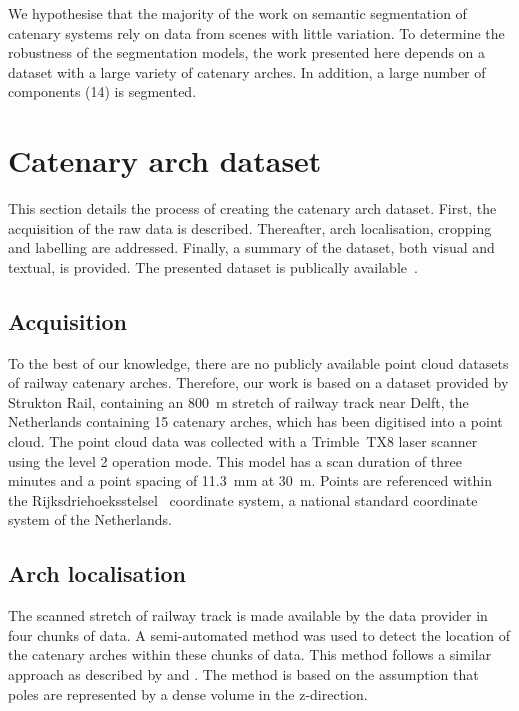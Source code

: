 We hypothesise that the majority of the work on semantic segmentation of catenary systems rely on data from scenes with little variation. To determine the robustness of the segmentation models, the work presented here depends on a dataset with a large variety of catenary arches.  In addition, a large number of components (14) is segmented.


\section{Catenary arch dataset}\label{sec:semseg:data}
This section details the process of creating the catenary arch dataset. First, the acquisition of the raw data is described. Thereafter, arch localisation, cropping and labelling are addressed. Finally, a summary of the dataset, both visual and textual, is provided. The presented dataset is publically available~\cite{ton2022labelled}.

\subsection{Acquisition}
To the best of our knowledge, there are no publicly available point cloud datasets of railway catenary arches.
Therefore, our work is based on a dataset provided by Strukton Rail, containing an 800~m stretch of railway track near Delft, the Netherlands containing 15 catenary arches, which has been digitised into a point cloud. The point cloud data was collected with a Trimble~TX8 laser scanner using the level 2 operation mode. This model has a scan duration of three minutes and a point spacing of 11.3~mm at 30~m.
Points are referenced within the Rijksdriehoeksstelsel~\cite{Bruijne.05} coordinate system, a national standard coordinate system of the Netherlands.

\subsection{Arch localisation}
The scanned stretch of railway track is made available by the data provider in four chunks of data. A semi-automated method was used to detect the location of the catenary arches within these chunks of data. This method follows a similar approach as described by \citeauthor{zhu2014the} and \citeauthor{corongiu2020classification}. The method is based on the assumption that poles are represented by a dense volume in the z-direction.

